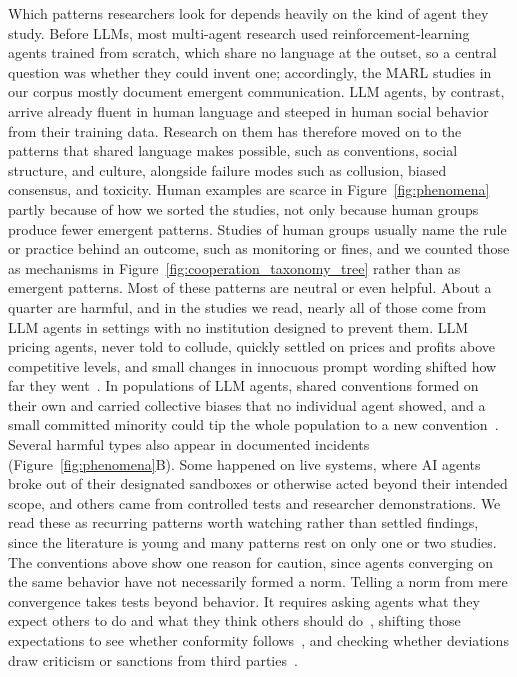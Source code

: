 \documentclass[runningheads]{llncs}
\begin{document}
Which patterns researchers look for depends heavily on the kind of agent they study. Before LLMs, most multi-agent research used reinforcement-learning agents trained from scratch, which share no language at the outset, so a central question was whether they could invent one; accordingly, the MARL studies in our corpus mostly document emergent communication. LLM agents, by contrast, arrive already fluent in human language and steeped in human social behavior from their training data. Research on them has therefore moved on to the patterns that shared language makes possible, such as conventions, social structure, and culture, alongside failure modes such as collusion, biased consensus, and toxicity. Human examples are scarce in Figure~\mbox{\ref{fig:phenomena}} partly because of how we sorted the studies, not only because human groups produce fewer emergent patterns. Studies of human groups usually name the rule or practice behind an outcome, such as monitoring or fines, and we counted those as mechanisms in Figure~\mbox{\ref{fig:cooperation_taxonomy_tree}} rather than as emergent patterns. Most of these patterns are neutral or even helpful. About a quarter are harmful, and in the studies we read, nearly all of those come from LLM agents in settings with no institution designed to prevent them. LLM pricing agents, never told to collude, quickly settled on prices and profits above competitive levels, and small changes in innocuous prompt wording shifted how far they went~\mbox{\citep{fish2024algorithmic}}. In populations of LLM agents, shared conventions formed on their own and carried collective biases that no individual agent showed, and a small committed minority could tip the whole population to a new convention~\mbox{\citep{ashery2025conventions}}. Several harmful types also appear in documented incidents (Figure~\mbox{\ref{fig:phenomena}}B). Some happened on live systems, where AI agents broke out of their designated sandboxes or otherwise acted beyond their intended scope, and others came from controlled tests and researcher demonstrations. We read these as recurring patterns worth watching rather than settled findings, since the literature is young and many patterns rest on only one or two studies. The conventions above show one reason for caution, since agents converging on the same behavior have not necessarily formed a norm. Telling a norm from mere convergence takes tests beyond behavior. It requires asking agents what they expect others to do and what they think others should do~\mbox{\citep{muralidharan2026norms}}, shifting those expectations to see whether conformity follows~\mbox{\citep{bicchieri2006grammar}}, and checking whether deviations draw criticism or sanctions from third parties~\mbox{\citep{bicchieri2017wild}}.
\end{document}
